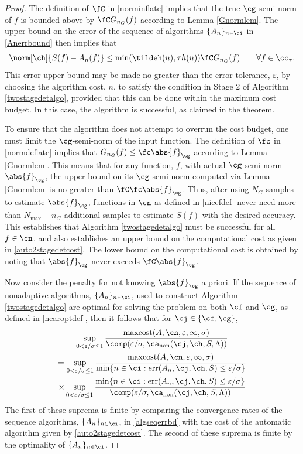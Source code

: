 \documentclass[]{elsarticle}
\DeclareMathOperator{\fix}{non}
\DeclareMathOperator{\err}{err}
\DeclareMathOperator{\maxcost}{maxcost}
\theoremstyle{definition}
\theoremstyle{remark}
\newcommand{\Gnorm}[1]{\abs{#1}_{\cg}}
\begin{document}
\begin{proof} The definition of $\fC$ in \eqref{norminflate} implies that the true $\cg$-semi-norm of $f$ is bounded above by $\fC G_{n_G}(f)$ according to Lemma \ref{Gnormlem}.  The upper bound on the error of the sequence of algorithms $\{A_n\}_{n \in \ci}$ in \eqref{Anerrbound} then implies that 
\[
\norm[\ch]{S(f) -  A_n(f)} \le \min(\tildeh(n),\tau h(n)) \fC G_{n_G}(f) \qquad \forall f \in \cc_{\tau}.
\]
This error upper bound may be made no greater than the error tolerance, $\varepsilon$, by choosing the algorithm cost, $n$, to satisfy the condition in Stage 2 of Algorithm \ref{twostagedetalgo}, provided that this can be done within the maximum cost budget.  In this case, the algorithm is successful, as claimed in the theorem.

To ensure that the algorithm does not attempt to overrun the cost budget, one must limit the $\cg$-semi-norm of the input function.  The definition of  $\fc$ in \eqref{normdeflate} implies that $G_{n_G}(f) \le \fc\Gnorm{f}$ according to Lemma \ref{Gnormlem}. This means that for any function, $f$, with actual $\cg$-semi-norm $\Gnorm{f}$, the upper bound on its $\cg$-semi-norm computed via Lemma \ref{Gnormlem} is no greater than $\fC \fc \Gnorm{f}$.  Thus, after using $N_G$ samples to estimate $\Gnorm{f}$, functions in $\cn$ as defined in \eqref{nicefdef} never need more than $N_{\max} - n_G$ additional samples to estimate $S(f)$ with the desired accuracy.  This establishes that Algorithm \ref{twostagedetalgo} must be successful for all $f \in \cn$, and also establishes an upper bound on the computational cost as given in \eqref{auto2stagedetcost}.  The lower bound on the computational cost is obtained by noting that $\Gnorm{f}$ never exceeds $\fC \Gnorm{f}$. 

Now consider the penalty for not knowing $\Gnorm{f}$ a priori.  If the sequence of nonadaptive algorithms, $\{A_n\}_{n \in \ci}$, used to construct Algorithm \ref{twostagedetalgo} are optimal for solving the problem on both $\cf$ and $\cg$, as defined in \eqref{nearoptdef}, then it follows that for $\cj \in \{\cf,\cg\}$,
\begin{multline*}
\sup_{0 < \varepsilon/\sigma \le 1} \frac{\maxcost(A,\cn,\varepsilon,\infty,\sigma)} {\comp(\varepsilon/\sigma,\ca_{\fix}(\cj,\ch,S,\Lambda))} \\
= \sup_{0 < \varepsilon/\sigma \le 1} \frac{\maxcost(A,\cn,\varepsilon,\infty,\sigma)}{\min\{n \in \ci : \err(A_n,\cj,\ch,S) \le \varepsilon/\sigma\}} \\
 \times \sup_{0 < \varepsilon/\sigma \le 1} \frac{\min\{n \in \ci : \err(A_n,\cj,\ch,S) \le \varepsilon/\sigma\}} {\comp(\varepsilon/\sigma,\ca_{\fix}(\cj,\ch,S,\Lambda))}
\end{multline*} 
The first of these suprema is finite by comparing the convergence rates of the sequence algorithms, $\{A_n\}_{n \in \ci}$, in \eqref{algseqerrbd} with the cost of the automatic algorithm given by \eqref{auto2stagedetcost}. The second of these suprema is finite by the optimality of $\{A_n\}_{n \in \ci}$.  
\end{proof}
\end{document}
